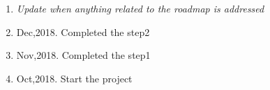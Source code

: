 \begin{enumerate}
    \item \textit{Update when anything related to the roadmap is addressed}
    \item Dec,2018. Completed the step2
    \item Nov,2018. Completed the step1
    \item Oct,2018. Start the project
\end{enumerate}